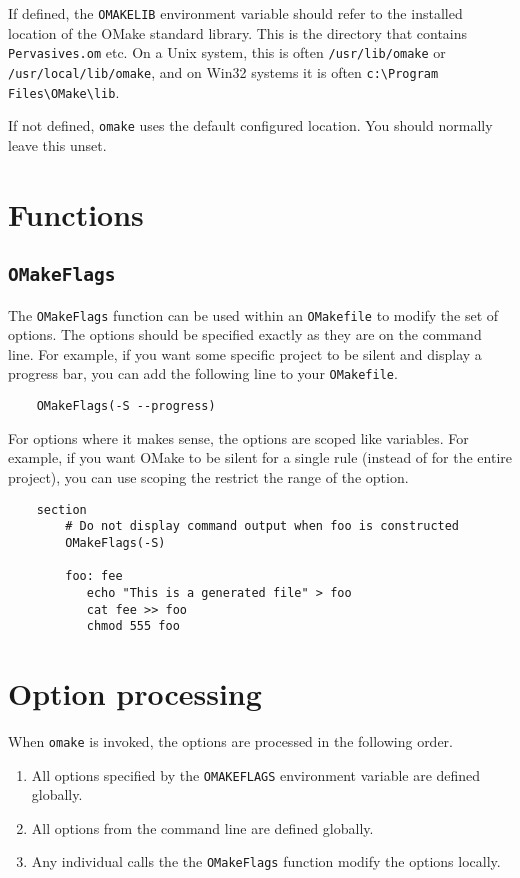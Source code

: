 If defined, the \verb+OMAKELIB+ environment variable should refer to the installed location of the
OMake standard library.  This is the directory that contains \verb+Pervasives.om+ etc.  On a Unix
system, this is often \verb+/usr/lib/omake+ or \verb+/usr/local/lib/omake+, and on Win32 systems it
is often \verb+c:\Program Files\OMake\lib+.

If not defined, \verb+omake+ uses the default configured location.  You should normally leave this
unset.

\section{Functions}

\subsection{\texttt{OMakeFlags}}

The \verb+OMakeFlags+ function can be used within an \verb+OMakefile+ to modify
the set of options.  The options should be specified exactly as they are on the command line.  For
example, if you want some specific project to be silent and display a progress bar, you can add the
following line to your \verb+OMakefile+.

\begin{verbatim}
    OMakeFlags(-S --progress)
\end{verbatim}

For options where it makes sense, the options are scoped like variables.  For example, if you want
OMake to be silent for a single rule (instead of for the entire project), you can use scoping the
restrict the range of the option.

\begin{verbatim}
    section
        # Do not display command output when foo is constructed
        OMakeFlags(-S)

        foo: fee
           echo "This is a generated file" > foo
           cat fee >> foo
           chmod 555 foo
\end{verbatim}

\section{Option processing}

When \verb+omake+ is invoked, the options are processed in the following order.

\begin{enumerate}
\item All options specified by the \verb+OMAKEFLAGS+ environment variable are defined globally.
\item All options from the command line are defined globally.
\item Any individual calls the the \verb+OMakeFlags+ function modify the options locally.
\end{enumerate}

